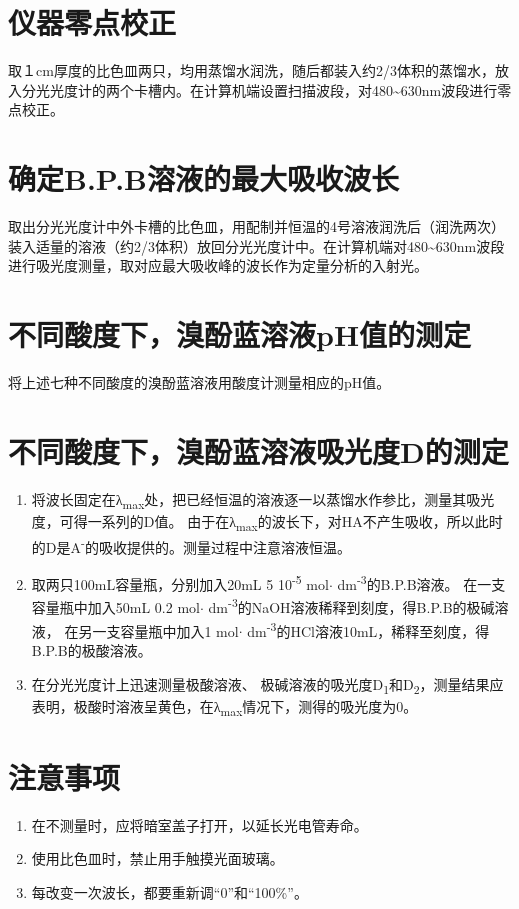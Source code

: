 \documentclass[11pt]{report}
\begin{document}
\section{仪器零点校正}
\label{sec:org6f705cd}
取１cm厚度的比色皿两只，均用蒸馏水润洗，随后都装入约2/3体积的蒸馏水，放入分光光度计的两个卡槽内。在计算机端设置扫描波段，对480\textasciitilde{}630nm波段进行零点校正。
\section{确定B.P.B溶液的最大吸收波长}
\label{sec:org5cbe342}
取出分光光度计中外卡槽的比色皿，用配制并恒温的4号溶液润洗后（润洗两次）装入适量的溶液（约2/3体积）放回分光光度计中。在计算机端对480\textasciitilde{}630nm波段进行吸光度测量，取对应最大吸收峰的波长作为定量分析的入射光。
\section{不同酸度下，溴酚蓝溶液pH值的测定}
\label{sec:org5b844c9}
将上述七种不同酸度的溴酚蓝溶液用酸度计测量相应的pH值。
\section{不同酸度下，溴酚蓝溶液吸光度D的测定}
\label{sec:org10cd724}
\begin{enumerate}
\item 将波长固定在λ\textsubscript{max}处，把已经恒温的溶液逐一以蒸馏水作参比，测量其吸光度，可得一系列的D值。
由于在λ\textsubscript{max}的波长下，对HA不产生吸收，所以此时的D是A\textsuperscript{-}的吸收提供的。测量过程中注意溶液恒温。
\item 取两只100mL容量瓶，分别加入20mL 5\texttimes{} 10\textsuperscript{-5} mol\(\cdot\) dm\textsuperscript{-3}的B.P.B溶液。
在一支容量瓶中加入50mL 0.2 mol\(\cdot\) dm\textsuperscript{-3}的NaOH溶液稀释到刻度，得B.P.B的极碱溶液，
在另一支容量瓶中加入1 mol\(\cdot\) dm\textsuperscript{-3}的HCl溶液10mL，稀释至刻度，得B.P.B的极酸溶液。
\item 在分光光度计上迅速测量极酸溶液、
极碱溶液的吸光度D\textsubscript{1}和D\textsubscript{2}，测量结果应表明，极酸时溶液呈黄色，在λ\textsubscript{max}情况下，测得的吸光度为0。
\end{enumerate}
\section{注意事项}
\label{sec:orga2c455c}
\begin{enumerate}
\item 在不测量时，应将暗室盖子打开，以延长光电管寿命。
\item 使用比色皿时，禁止用手触摸光面玻璃。
\item 每改变一次波长，都要重新调“0”和“100\%”。
\end{enumerate}
\end{document}
